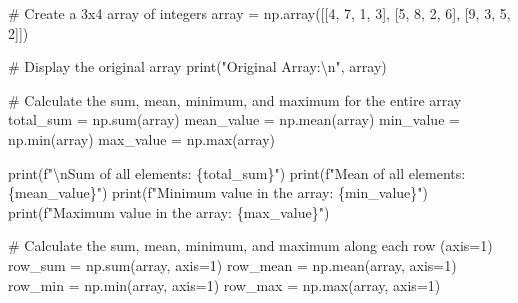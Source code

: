 \documentclass[
  letterpaper,
  DIV=11,
  numbers=noendperiod]{scrreprt}
\newenvironment{Shaded}{\begin{snugshade}}{\end{snugshade}}
\newcommand{\BuiltInTok}[1]{\textcolor[rgb]{0.00,0.23,0.31}{#1}}
\newcommand{\CharTok}[1]{\textcolor[rgb]{0.13,0.47,0.30}{#1}}
\newcommand{\CommentTok}[1]{\textcolor[rgb]{0.37,0.37,0.37}{#1}}
\newcommand{\DecValTok}[1]{\textcolor[rgb]{0.68,0.00,0.00}{#1}}
\newcommand{\NormalTok}[1]{\textcolor[rgb]{0.00,0.23,0.31}{#1}}
\newcommand{\OperatorTok}[1]{\textcolor[rgb]{0.37,0.37,0.37}{#1}}
\newcommand{\SpecialCharTok}[1]{\textcolor[rgb]{0.37,0.37,0.37}{#1}}
\newcommand{\SpecialStringTok}[1]{\textcolor[rgb]{0.13,0.47,0.30}{#1}}
\newcommand{\StringTok}[1]{\textcolor[rgb]{0.13,0.47,0.30}{#1}}
\begin{document}
\begin{Shaded}
\begin{Highlighting}[]
\CommentTok{\# Create a 3x4 array of integers}
\NormalTok{array }\OperatorTok{=}\NormalTok{ np.array([[}\DecValTok{4}\NormalTok{, }\DecValTok{7}\NormalTok{, }\DecValTok{1}\NormalTok{, }\DecValTok{3}\NormalTok{],}
\NormalTok{                  [}\DecValTok{5}\NormalTok{, }\DecValTok{8}\NormalTok{, }\DecValTok{2}\NormalTok{, }\DecValTok{6}\NormalTok{],}
\NormalTok{                  [}\DecValTok{9}\NormalTok{, }\DecValTok{3}\NormalTok{, }\DecValTok{5}\NormalTok{, }\DecValTok{2}\NormalTok{]])}

\CommentTok{\# Display the original array}
\BuiltInTok{print}\NormalTok{(}\StringTok{"Original Array:}\CharTok{\textbackslash{}n}\StringTok{"}\NormalTok{, array)}

\CommentTok{\# Calculate the sum, mean, minimum, and maximum for the entire array}
\NormalTok{total\_sum }\OperatorTok{=}\NormalTok{ np.}\BuiltInTok{sum}\NormalTok{(array)}
\NormalTok{mean\_value }\OperatorTok{=}\NormalTok{ np.mean(array)}
\NormalTok{min\_value }\OperatorTok{=}\NormalTok{ np.}\BuiltInTok{min}\NormalTok{(array)}
\NormalTok{max\_value }\OperatorTok{=}\NormalTok{ np.}\BuiltInTok{max}\NormalTok{(array)}

\BuiltInTok{print}\NormalTok{(}\SpecialStringTok{f"}\CharTok{\textbackslash{}n}\SpecialStringTok{Sum of all elements: }\SpecialCharTok{\{}\NormalTok{total\_sum}\SpecialCharTok{\}}\SpecialStringTok{"}\NormalTok{)  }
\BuiltInTok{print}\NormalTok{(}\SpecialStringTok{f"Mean of all elements: }\SpecialCharTok{\{}\NormalTok{mean\_value}\SpecialCharTok{\}}\SpecialStringTok{"}\NormalTok{)  }
\BuiltInTok{print}\NormalTok{(}\SpecialStringTok{f"Minimum value in the array: }\SpecialCharTok{\{}\NormalTok{min\_value}\SpecialCharTok{\}}\SpecialStringTok{"}\NormalTok{)  }
\BuiltInTok{print}\NormalTok{(}\SpecialStringTok{f"Maximum value in the array: }\SpecialCharTok{\{}\NormalTok{max\_value}\SpecialCharTok{\}}\SpecialStringTok{"}\NormalTok{)  }

\CommentTok{\# Calculate the sum, mean, minimum, and maximum along each row (axis=1)}
\NormalTok{row\_sum }\OperatorTok{=}\NormalTok{ np.}\BuiltInTok{sum}\NormalTok{(array, axis}\OperatorTok{=}\DecValTok{1}\NormalTok{)}
\NormalTok{row\_mean }\OperatorTok{=}\NormalTok{ np.mean(array, axis}\OperatorTok{=}\DecValTok{1}\NormalTok{)}
\NormalTok{row\_min }\OperatorTok{=}\NormalTok{ np.}\BuiltInTok{min}\NormalTok{(array, axis}\OperatorTok{=}\DecValTok{1}\NormalTok{)}
\NormalTok{row\_max }\OperatorTok{=}\NormalTok{ np.}\BuiltInTok{max}\NormalTok{(array, axis}\OperatorTok{=}\DecValTok{1}\NormalTok{)}


\end{Highlighting}
\end{Shaded}
\end{document}
